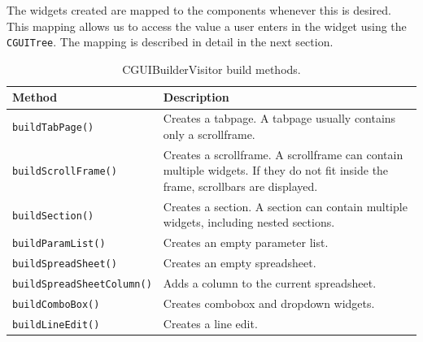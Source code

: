The widgets created are mapped to the components whenever this is desired. This
mapping allows us to access the value a user enters in the widget using the
\verb=CGUITree=. The mapping is described in detail in the next section.

\begin{table} \begin{center}
\caption{CGUIBuilderVisitor build methods.}
\label{tab:design:CGUIBuilderVisitor}
\begin{tabular}{l|p{6cm}}
\hline
 \textsf{Method}          & \textsf{Description}                                                                                                                     \\
\hline
 \verb=buildTabPage()=           & Creates a tabpage. A tabpage usually contains only a scrollframe.                                                                 \\
 \verb=buildScrollFrame()=       & Creates a scrollframe. A scrollframe can contain multiple widgets. If they do not fit inside the frame, scrollbars are displayed. \\
 \verb=buildSection()=           & Creates a section. A section can contain multiple widgets, including nested sections.                                             \\
 \verb=buildParamList()=         & Creates an empty parameter list.                                                                                                  \\
 \verb=buildSpreadSheet()=       & Creates an empty spreadsheet.                                                                                                     \\
 \verb=buildSpreadSheetColumn()= & Adds a column to the current spreadsheet.                                                                                         \\
 \verb=buildComboBox()=          & Creates combobox and dropdown widgets.                                                                                            \\
 \verb=buildLineEdit()=          & Creates a line edit.                                                                                                              \\
\hline
\end{tabular} \end{center} \end{table}


